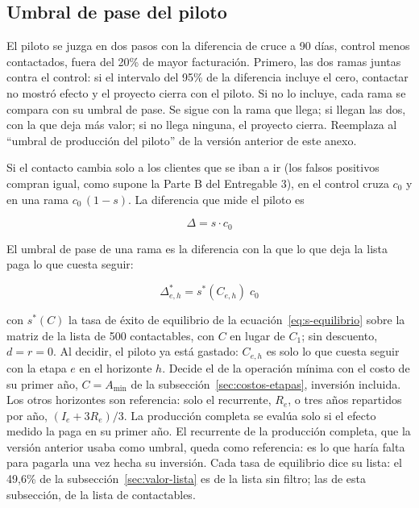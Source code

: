\documentclass[11pt,a4paper]{article}
\begin{document}
\subsection{Umbral de pase del piloto}
\label{sec:umbral-piloto}

El piloto se juzga en dos pasos con la diferencia de cruce a 90 días, control menos contactados, fuera del 20\% de mayor facturación. Primero, las dos ramas juntas contra el control: si el intervalo del 95\% de la diferencia incluye el cero, contactar no mostró efecto y el proyecto cierra con el piloto. Si no lo incluye, cada rama se compara con su umbral de pase. Se sigue con la rama que llega; si llegan las dos, con la que deja más valor; si no llega ninguna, el proyecto cierra. Reemplaza al ``umbral de producción del piloto'' de la versión anterior de este anexo.

Si el contacto cambia solo a los clientes que se iban a ir (los falsos positivos compran igual, como supone la Parte B del Entregable 3), en el control cruza $c_0$ y en una rama $c_0\,(1-s)$. La diferencia que mide el piloto es

\begin{equation}
\Delta = s \cdot c_0
\label{eq:diferencia-piloto}
\end{equation}

El umbral de pase de una rama es la diferencia con la que lo que deja la lista paga lo que cuesta seguir:

\begin{equation*}
\Delta^{*}_{e,h} = s^{*}(C_{e,h})\; c_0
\end{equation*}

con $s^*(C)$ la tasa de éxito de equilibrio de la ecuación~\eqref{eq:s-equilibrio} sobre la matriz de la lista de 500 contactables, con $C$ en lugar de $C_1$; sin descuento, $d = r = 0$. Al decidir, el piloto ya está gastado: $C_{e,h}$ es solo lo que cuesta seguir con la etapa $e$ en el horizonte $h$. Decide el de la operación mínima con el costo de su primer año, $C = A_{\min}$ de la subsección~\ref{sec:costos-etapas}, inversión incluida. Los otros horizontes son referencia: solo el recurrente, $R_e$, o tres años repartidos por año, $(I_e + 3R_e)/3$. La producción completa se evalúa solo si el efecto medido la paga en su primer año. El recurrente de la producción completa, que la versión anterior usaba como umbral, queda como referencia: es lo que haría falta para pagarla una vez hecha su inversión. Cada tasa de equilibrio dice su lista: el 49,6\% de la subsección~\ref{sec:valor-lista} es de la lista sin filtro; las de esta subsección, de la lista de contactables.
\end{document}
